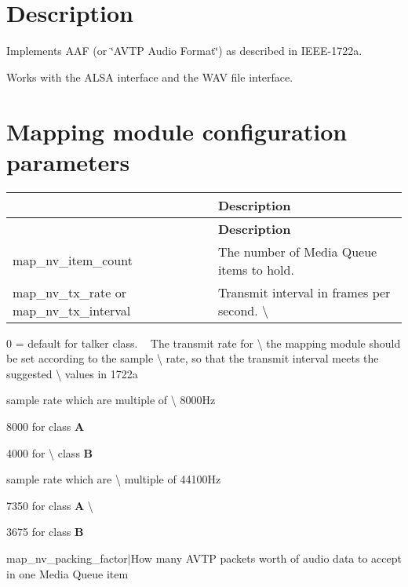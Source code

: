 \section*{Description}

Implements A\+AF (or \char`\"{}\+A\+V\+T\+P Audio Format\char`\"{}) as described in I\+E\+E\+E-\/1722a.

Works with the A\+L\+SA interface and the W\+AV file interface.

\section*{Mapping module configuration parameters}

\tabulinesep=1mm
\begin{longtabu} spread 0pt [c]{*2{|X[-1]}|}
\hline
{}&{\bf Description  }\\
\endfirsthead
\hline
\endfoot
\hline
{}&{\bf Description  }\\
\endhead
map\+\_\+nv\+\_\+item\+\_\+count &The number of Media Queue items to hold. \\
map\+\_\+nv\+\_\+tx\+\_\+rate or map\+\_\+nv\+\_\+tx\+\_\+interval &Transmit interval in frames per second. \textbackslash{} \\
\end{longtabu}
0 = default for talker class. ~\newline
 The transmit rate for \textbackslash{} the mapping module should be set according to the sample \textbackslash{} rate, so that the transmit interval meets the suggested \textbackslash{} values in 1722a 
\begin{DoxyItemize}
\item sample rate which are multiple of \textbackslash{} 8000\+Hz 
\begin{DoxyItemize}
\item 8000 for class {\bfseries A}
\item 4000 for \textbackslash{} class {\bfseries B}
\end{DoxyItemize}
\item sample rate which are \textbackslash{} multiple of 44100\+Hz
\begin{DoxyItemize}
\item 7350 for class {\bfseries A} \textbackslash{} 
\item 3675 for class {\bfseries B}
\end{DoxyItemize}
\end{DoxyItemize}map\+\_\+nv\+\_\+packing\+\_\+factor$\vert$\+How many A\+V\+TP packets worth of audio data to accept in one Media Queue item

